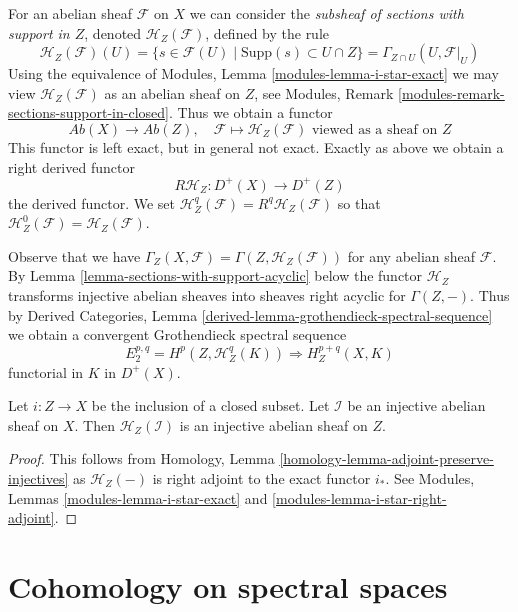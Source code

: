 \medskip\noindent
For an abelian sheaf $\mathcal{F}$ on $X$ we can consider the
{\it subsheaf of sections with support in $Z$}, denoted
$\mathcal{H}_Z(\mathcal{F})$, defined by the rule
$$
\mathcal{H}_Z(\mathcal{F})(U) =
\{s \in \mathcal{F}(U) \mid \text{Supp}(s) \subset U \cap Z\} =
\Gamma_{Z \cap U}(U, \mathcal{F}|_U)
$$
Using the equivalence of Modules, Lemma \ref{modules-lemma-i-star-exact}
we may view $\mathcal{H}_Z(\mathcal{F})$ as an abelian sheaf on $Z$, see
Modules, Remark \ref{modules-remark-sections-support-in-closed}.
Thus we obtain a functor
$$
\textit{Ab}(X) \longrightarrow \textit{Ab}(Z),\quad
\mathcal{F} \longmapsto
\mathcal{H}_Z(\mathcal{F})\text{ viewed as a sheaf on }Z
$$
This functor is left exact, but in general not exact. Exactly as above
we obtain a right derived functor
$$
R\mathcal{H}_Z : D^+(X) \longrightarrow D^+(Z)
$$
the derived functor. We set
$\mathcal{H}^q_Z(\mathcal{F}) = R^q\mathcal{H}_Z(\mathcal{F})$ so that
$\mathcal{H}^0_Z(\mathcal{F}) = \mathcal{H}_Z(\mathcal{F})$.

\medskip\noindent
Observe that we have
$\Gamma_Z(X, \mathcal{F}) = \Gamma(Z, \mathcal{H}_Z(\mathcal{F}))$
for any abelian sheaf $\mathcal{F}$. By
Lemma \ref{lemma-sections-with-support-acyclic} below
the functor $\mathcal{H}_Z$ transforms injective abelian sheaves
into sheaves right acyclic for $\Gamma(Z, -)$. Thus by
Derived Categories, Lemma \ref{derived-lemma-grothendieck-spectral-sequence}
we obtain a convergent Grothendieck spectral sequence
$$
E_2^{p, q} = H^p(Z, \mathcal{H}^q_Z(K)) \Rightarrow H^{p + q}_Z(X, K)
$$
functorial in $K$ in $D^+(X)$.

\begin{lemma}
\label{lemma-sections-with-support-acyclic}
Let $i : Z \to X$ be the inclusion of a closed subset.
Let $\mathcal{I}$ be an injective abelian sheaf on $X$.
Then $\mathcal{H}_Z(\mathcal{I})$ is an injective abelian sheaf on $Z$.
\end{lemma}

\begin{proof}
This follows from
Homology, Lemma \ref{homology-lemma-adjoint-preserve-injectives}
as $\mathcal{H}_Z(-)$ is right adjoint to the exact functor $i_*$.
See Modules, Lemmas \ref{modules-lemma-i-star-exact} and
\ref{modules-lemma-i-star-right-adjoint}.
\end{proof}




\section{Cohomology on spectral spaces}
\label{section-spectral}


